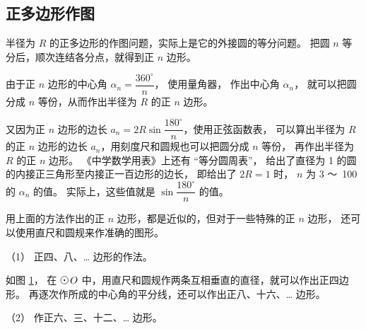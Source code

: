 \subsection{正多边形作图}\label{subsec:czjh2-7-18}

\begin{enhancedline}

半径为 $R$ 的正多边形的作图问题，实际上是它的外接圆的等分问题。
把圆 $n$ 等分后，顺次连结各分点，就得到正 $n$ 边形。

由于正 $n$ 边形的中心角 $\alpha_n = \dfrac{360^\circ}{n}$， 使用量角器，
作出中心角 $\alpha_n$， 就可以把圆分成 $n$ 等份，从而作出半径为 $R$ 的正 $n$ 边形。

又因为正 $n$ 边形的边长 $a_n = 2 R \sin \dfrac{180^\circ}{n}$，使用正弦函数表，
可以算出半径为 $R$ 的正 $n$ 边形的边长 $a_n$，用刻度尺和圆规也可以把圆分成 $n$ 等份，
再作出半径为 $R$ 的正 $n$ 边形。 《中学数学用表》上还有 “等分圆周表”，
给出了直径为 1 的圆的内接正三角形至内接正一百边形的边长，
即给出了 $2R = 1$ 时， $n$ 为 3 ～\, 100 的 $\alpha_n$ 的值。
实际上，这些值就是 $\sin\dfrac{180^\circ}{n}$ 的值。

用上面的方法作出的正 $n$ 边形，都是近似的，但对于一些特殊的正 $n$ 边形，
还可以使用直尺和圆规来作准确的图形。

（1） 正四、八、… 边形的作法。

\begin{figure}[htbp]
    \centering
    \begin{minipage}[b]{7cm}
        
    \end{minipage}
    \begin{minipage}[b]{7cm}
        
    \end{minipage}
    \caption{}\label{fig:czjh2-7-70}
\end{figure}


如图 \ref{fig:czjh2-7-70}， 在 $\yuan\,O$ 中，用直尺和圆规作两条互相垂直的直径，就可以作出正四边形。
再逐次作所成的中心角的平分线，还可以作出正八、十六、… 边形。

（2） 作正六、三、十二、… 边形。

\begin{figure}[htbp]
    \centering
    \begin{minipage}[b]{5cm}
        
    \end{minipage}
    \begin{minipage}[b]{5cm}
        
    \end{minipage}
    \begin{minipage}[b]{5cm}
        
    \end{minipage}
    \caption{}\label{fig:czjh2-7-71}
\end{figure}


\end{enhancedline}
